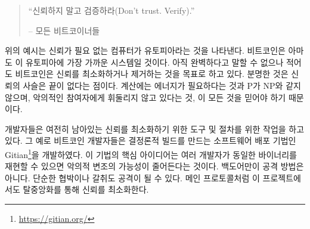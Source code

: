 \begin{quotation}\begin{samepage}
		\enquote{신뢰하지 말고 검증하라(Don’t trust. Verify).}
		\begin{flushright} -- 모든 비트코이너들
\end{flushright}\end{samepage}\end{quotation}

\begin{comment}
	The above examp과과es should illustrate that \textit{trustless} computing is
	utopic. Bitcoin is probably the one system which comes closest to this
	utopia, but still, it is \textit{trust-minimized} --- aiming to remove trust
	wherever possible. Arguably, the chain-of-trust is neverending, since
	you will also have to trust that computation requires energy, that P
	does not equal NP, and that you are actually in base reality and not
	imprisoned in a simulation by malicious actors.
\end{comment}
위의 예시는 신뢰가 필요 없는 컴퓨터가 유토피아라는 것을 나타낸다.
비트코인은 아마도 이 유토피아에 가장 가까운 시스템일 것이다.
아직 완벽하다고 말할 수 없으나 적어도 비트코인은 신뢰를 최소화하거나 제거하는 것을 목표로 하고 있다.
분명한 것은 신뢰의 사슬은 끝이 없다는 점이다.
계산에는 에너지가 필요하다는 것과 P가 NP와 같지 않으며, 
악의적인 참여자에게 휘둘리지 않고 있다는 것, 이 모든 것을 믿어야 하기 때문이다.

\begin{comment}
	Developers are working on tools and procedures to minimize any remaining trust
	even further. For example, Bitcoin developers created
	Gitian\footnote{\url{https://gitian.org/}}, which is a software distribution
	method to create deterministic builds. The idea is that if multiple developers
	are able to reproduce identical binaries, the chance of malicious tampering is
	reduced. Fancy backdoors aren't the only attack vector. Simple blackmail or
	extortion are real threats as well. As in the main protocol, decentralization is
	used to minimize trust.
\end{comment}
개발자들은 여전히 남아있는 신뢰를 최소화하기 위한 도구 및 절차를 위한 작업을 하고 있다.
그 예로 비트코인 개발자들은 결정론적 빌드를 만드는 소프트웨어 배포 기법인 Gitian\footnote{\url{https://gitian.org/}}을 개발하였다.
이 기법의 핵심 아이디어는 여러 개발자가 동일한 바이너리를 재현할 수 있으면 악의적 변조의 가능성이 줄어든다는 것이다.
백도어만이 공격 방법은 아니다. 단순한 협박이나 갈취도 공격이 될 수 있다.
메인 프로토콜처럼 이 프로젝트에서도 탈중앙화를 통해 신뢰를 최소화한다.

